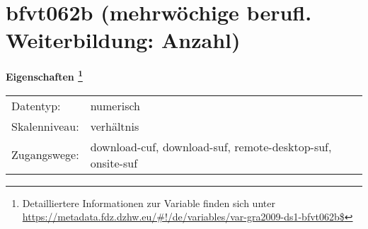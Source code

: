 
    \setcounter{footnote}{0}

    \vspace*{-1.8cm}
	\section{bfvt062b (mehrwöchige berufl. Weiterbildung: Anzahl)}
	\label{section:bfvt062b}



    \vspace*{0.5cm}
    \noindent\textbf{Eigenschaften
	\footnote{Detailliertere Informationen zur Variable finden sich unter
		\url{https://metadata.fdz.dzhw.eu/\#!/de/variables/var-gra2009-ds1-bfvt062b$}}}\\
	\begin{tabularx}{\hsize}{@{}lX}
	Datentyp: & numerisch \\
	Skalenniveau: & verhältnis \\
	Zugangswege: &
	  download-cuf, 
	  download-suf, 
	  remote-desktop-suf, 
	  onsite-suf
 \\
    \end{tabularx}



